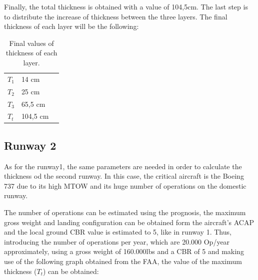 		Finally, the total thickness is obtained with a value of 104,5cm. The last step is to distribute the increase of thickness between the three layers. The final thickness of each layer will be the following:
		
		\begin{table}[htb]
			\centering
			\begin{tabular}{ll p{5cm}}
				\midrule[2pt]
				\(T_1\)& 14 cm\\
				\(T_2\) & 25 cm\\
				\(T_3\)& 65,5 cm \\
				\(T_t\)& 104,5 cm\\
				\bottomrule[2pt]
			\end{tabular}
			\caption{Final values of thickness of each layer.}
			\label{}
		\end{table}
		
		\subsection{Runway 2}
		As for the runway1, the same parameters are needed in order to calculate the thickness od the second runway. In this case, the critical aircraft is the Boeing 737 due to its high MTOW and its huge number of operations on the domestic runway.
		
		The number of operations can be estimated using the prognosis, the maximum gross weight and landing configuration can be obtained form the aircraft's ACAP and the local ground CBR value is estimated to 5, like in runway 1. Thus, introducing the number of operations per year, which are 20.000 Op/year approximately, using a gross weight of 160.000lbs and a CBR of 5 and making use of the following graph obtained from the FAA, the value of the maximum thickness (\(T_{t}\)) can be obtained:
		
